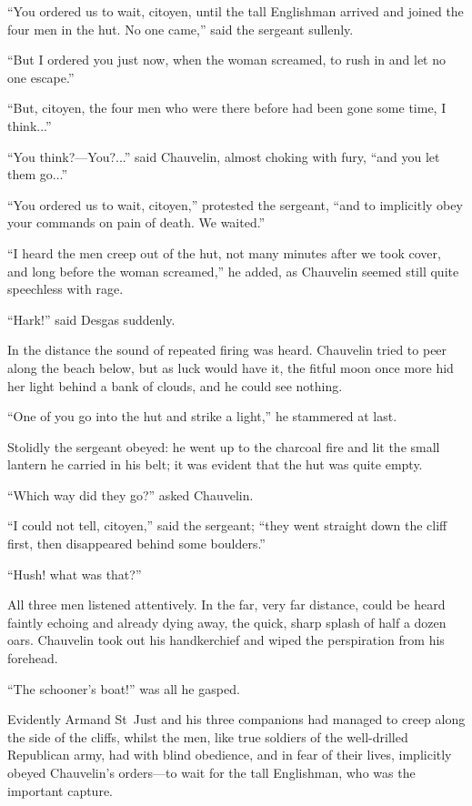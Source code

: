 \enquote{You ordered us to wait, citoyen, until the tall Englishman arrived and joined the four men in the hut. No one came,} said the sergeant sullenly.

\enquote{But I ordered you just now, when the woman screamed, to rush in and let no one escape.}

\enquote{But, citoyen, the four men who were there before had been gone some time, I think...}

\enquote{You think?---You?...} said Chauvelin, almost choking with fury, \enquote{and you let them go...}

\enquote{You ordered us to wait, citoyen,} protested the sergeant, \enquote{and to implicitly obey your commands on pain of death. We waited.}

\enquote{I heard the men creep out of the hut, not many minutes after we took cover, and long before the woman screamed,} he added, as Chauvelin seemed still quite speechless with rage.

\enquote{Hark!} said Desgas suddenly.

In the distance the sound of repeated firing was heard. Chauvelin tried to peer along the beach below, but as luck would have it, the fitful moon once more hid her light behind a bank of clouds, and he could see nothing.

\enquote{One of you go into the hut and strike a light,} he stammered at last.

Stolidly the sergeant obeyed: he went up to the charcoal fire and lit the small lantern he carried in his belt; it was evident that the hut was quite empty.

\enquote{Which way did they go?} asked Chauvelin.

\enquote{I could not tell, citoyen,} said the sergeant; \enquote{they went straight down the cliff first, then disappeared behind some boulders.}

\enquote{Hush! what was that?}

All three men listened attentively. In the far, very far distance, could be heard faintly echoing and already dying away, the quick, sharp splash of half a dozen oars. Chauvelin took out his handkerchief and wiped the perspiration from his forehead.

\enquote{The schooner's boat!} was all he gasped.

Evidently Armand St~Just and his three companions had managed to creep along the side of the cliffs, whilst the men, like true soldiers of the well-drilled Republican army, had with blind obedience, and in fear of their lives, implicitly obeyed Chauvelin's orders---to wait for the tall Englishman, who was the important capture.

